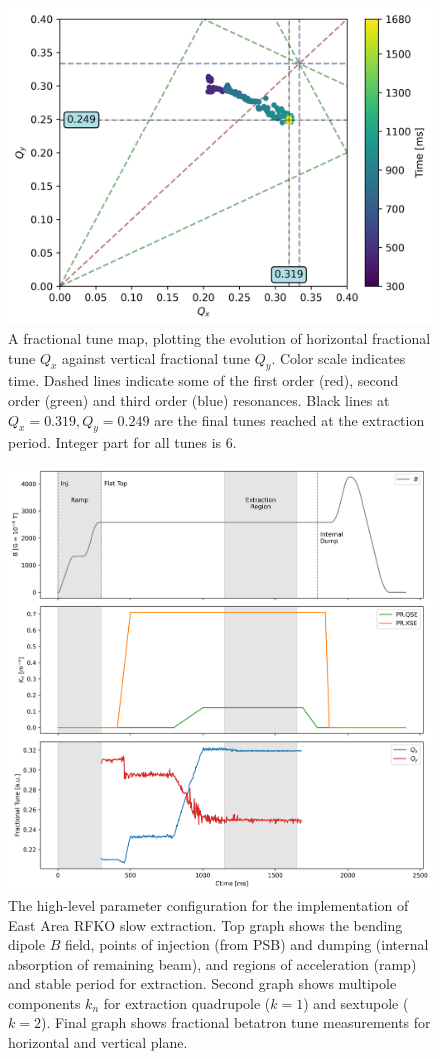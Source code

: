 \documentclass[11pt]{report}
\begin{document}
\begin{figure}
  \centering
  \includegraphics[width=0.6\linewidth]{tunemap.png}
  \caption{A fractional tune map, plotting the evolution of horizontal fractional tune $Q_x$ against vertical fractional tune $Q_y$. Color scale indicates time. Dashed lines indicate some of the first order (red), second order (green) and third order (blue) resonances. Black lines at $Q_x=0.319, Q_y=0.249$ are the final tunes reached at the extraction period. Integer part for all tunes is 6.}\label{fig:tunemap}
\end{figure}

\begin{figure}[h]
  \centering
  \includegraphics[width=\linewidth]{cyclegraphs.png}
  \caption{The high-level parameter configuration for the implementation of East Area RFKO slow extraction. Top graph shows the bending dipole $B$ field, points of injection (from PSB) and dumping (internal absorption of remaining beam), and regions of acceleration (ramp) and stable period for extraction. Second graph shows multipole components $k_n$ for extraction quadrupole ($k=1$) and sextupole ($k=2$). Final graph shows fractional betatron tune measurements for horizontal and vertical plane.}\label{fig:cycle}
\end{figure}
\end{document}

